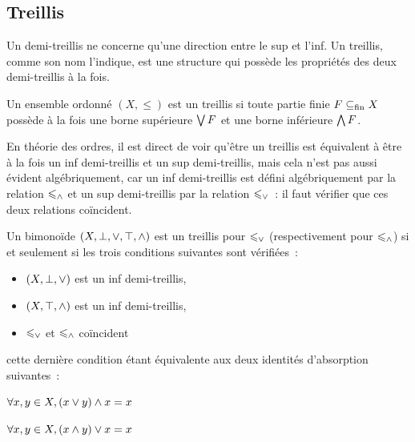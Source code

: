\subsection{Treillis}

Un demi-treillis ne concerne qu'une direction entre le sup et l'inf. Un
treillis, comme son nom l'indique, est une structure qui possède les propriétés
des deux demi-treillis à la fois.

\begin{definition}[Treillis]
  Un ensemble ordonné $(X,\leq)$ est un treillis si toute partie finie
  $F\subseteq_{\mathrm{fin}} X$ possède à la fois une borne supérieure $\bigvee F$ et une borne
  inférieure $\bigwedge F$.
\end{definition}

En théorie des ordres, il est direct de voir qu'être un treillis est équivalent
à être à la fois un inf demi-treillis et un sup demi-treillis, mais cela n'est
pas aussi évident algébriquement, car un inf demi-treillis est défini
algébriquement par la relation $\leqslant_{\wedge}$ et un sup demi-treillis par la
relation $\leqslant_{\vee}$~: il faut vérifier que ces deux relations coïncident.

\begin{proposition}
  Un bimonoïde $(X,\bot,\vee,\top,\wedge)$ est un treillis pour $\leqslant_{\vee}$
  (respectivement pour $\leqslant_{\wedge}$) si et seulement si les trois conditions
  suivantes sont vérifiées~:
  \begin{itemize}
  \item $(X,\bot,\vee)$ est un inf demi-treillis,
  \item $(X,\top,\wedge)$ est un inf demi-treillis,
  \item $\leqslant_{\vee}$ et $\leqslant_{\wedge}$ coïncident
  \end{itemize}
  cette dernière condition étant équivalente aux deux identités d'absorption
  suivantes~:
  \begin{itemize}
    \begin{minipage}{0.4\textwidth}
    \item $\forall x,y\in X, (x\vee y)\wedge x = x$
    \end{minipage}
    \begin{minipage}{0.4\textwidth}
    \item $\forall x,y\in X, (x\wedge y)\vee x = x$
    \end{minipage}
  \end{itemize}
\end{proposition}

